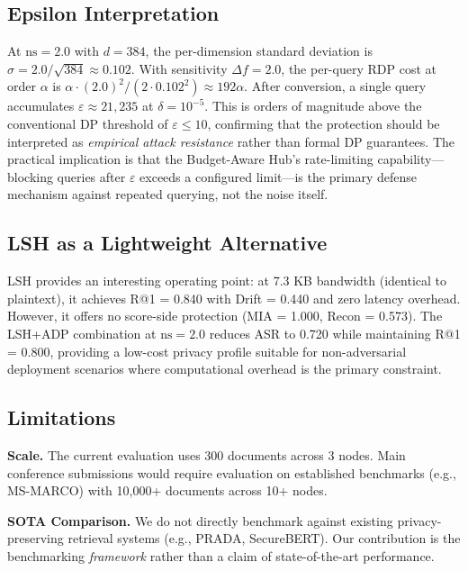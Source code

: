 \documentclass[conference]{IEEEtran}
\begin{document}
\subsection{Epsilon Interpretation}

At $\text{ns}=2.0$ with $d=384$, the per-dimension standard deviation is $\sigma = 2.0/\sqrt{384} \approx 0.102$. With sensitivity $\Delta f = 2.0$, the per-query RDP cost at order $\alpha$ is $\alpha \cdot (2.0)^2 / (2 \cdot 0.102^2) \approx 192\alpha$. After conversion, a single query accumulates $\varepsilon \approx 21{,}235$ at $\delta = 10^{-5}$. This is orders of magnitude above the conventional DP threshold of $\varepsilon \leq 10$, confirming that the protection should be interpreted as \textit{empirical attack resistance} rather than formal DP guarantees. The practical implication is that the Budget-Aware Hub's rate-limiting capability---blocking queries after $\varepsilon$ exceeds a configured limit---is the primary defense mechanism against repeated querying, not the noise itself.

\subsection{LSH as a Lightweight Alternative}

LSH provides an interesting operating point: at 7.3 KB bandwidth (identical to plaintext), it achieves R@1 = 0.840 with Drift = 0.440 and zero latency overhead. However, it offers no score-side protection (MIA = 1.000, Recon = 0.573). The LSH+ADP combination at $\text{ns}=2.0$ reduces ASR to 0.720 while maintaining R@1 = 0.800, providing a low-cost privacy profile suitable for non-adversarial deployment scenarios where computational overhead is the primary constraint.

\subsection{Limitations}

\textbf{Scale.} The current evaluation uses 300 documents across 3 nodes. Main conference submissions would require evaluation on established benchmarks (e.g., MS-MARCO) with 10,000+ documents across 10+ nodes.

\textbf{SOTA Comparison.} We do not directly benchmark against existing privacy-preserving retrieval systems (e.g., PRADA, SecureBERT). Our contribution is the benchmarking \textit{framework} rather than a claim of state-of-the-art performance.
\end{document}
